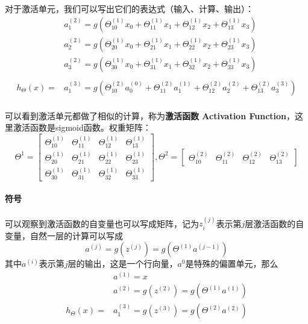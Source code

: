 \documentclass[../main.tex]{subfiles}
\begin{document}
对于激活单元，我们可以写出它们的表达式（输入、计算、输出）：
\begin{align*}
             & a_1^{(2)} = g(Θ_{10}^{(1)}x_0 + Θ_{11}^{(1)}x_1 + Θ_{12}^{(1)}x_2 + Θ_{13}^{(1)}x_3)                         \\
             & a_2^{(2)} = g(Θ_{20}^{(1)}x_0 + Θ_{21}^{(1)}x_1 + Θ_{22}^{(1)}x_2 + Θ_{23}^{(1)}x_3)                         \\
             & a_3^{(2)} = g(Θ_{30}^{(1)}x_0 + Θ_{31}^{(1)}x_1 + Θ_{32}^{(1)}x_2 + Θ_{33}^{(1)}x_3)                         \\
             &                                                                                                              \\
    h_Θ(x) = & a_1^{(3)} = g(Θ_{10}^{(2)}a_0^{(0)} + Θ_{11}^{(2)}a_1^{(1)} + Θ_{12}^{(2)}a_2^{(2)} + Θ_{13}^{(2)}a_3^{(3)}) \\
\end{align*}

可以看到激活单元都做了相似的计算，称为\textbf{激活函数 Activation Function}，这里激活函数是sigmoid函数。权重矩阵：
\[
    Θ^{1} = \begin{bmatrix}
        Θ_{10}^{(1)} & Θ_{11}^{(1)} & Θ_{12}^{(1)} & Θ_{13}^{(1)} \\
        Θ_{20}^{(1)} & Θ_{21}^{(1)} & Θ_{22}^{(1)} & Θ_{23}^{(1)} \\
        Θ_{30}^{(1)} & Θ_{31}^{(1)} & Θ_{32}^{(1)} & Θ_{33}^{(1)}
    \end{bmatrix},
    Θ^{2} = \begin{bmatrix}
        Θ_{10}^{(2)} & Θ_{11}^{(2)} & Θ_{12}^{(2)} & Θ_{13}^{(2)}
    \end{bmatrix}
\]

\paragraph{符号} 可以观察到激活函数的自变量也可以写成矩阵，记为\(z_i^{(j)}\)表示第\(j\)层激活函数的自变量，自然一层的计算可以写成
\[
    a^{(j)} = g(z^{(j)}) = g(Θ^{(1)}a^{(j-1)})
\]
其中\(a^(i)\)表示第\(j\)层的输出，这是一个行向量，\(a^0\)是特殊的偏置单元，那么
\begin{align*}
             & a^{(1)} = x                                \\
             & a^{(2)} = g(z^{(2)}) = g(Θ^{(1)}a^{(1)})   \\
    h_Θ(x) = & a_1^{(3)} = g(z^{(3)}) = g(Θ^{(2)}a^{(2)})
\end{align*}
\end{document}
